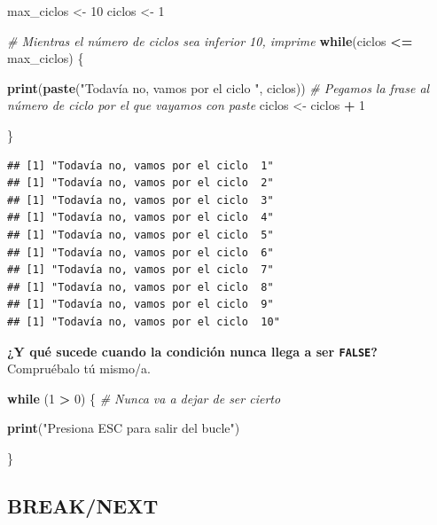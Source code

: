 \documentclass[11pt,]{book}
\newenvironment{Shaded}{\begin{snugshade}}{\end{snugshade}}
\newcommand{\CommentTok}[1]{\textcolor[rgb]{0.37,0.37,0.37}{\textit{#1}}}
\newcommand{\ControlFlowTok}[1]{\textcolor[rgb]{0.27,0.27,0.27}{\textbf{#1}}}
\newcommand{\DecValTok}[1]{\textcolor[rgb]{0.06,0.06,0.06}{#1}}
\newcommand{\KeywordTok}[1]{\textcolor[rgb]{0.27,0.27,0.27}{\textbf{#1}}}
\newcommand{\NormalTok}[1]{#1}
\newcommand{\OperatorTok}[1]{\textcolor[rgb]{0.43,0.43,0.43}{\textbf{#1}}}
\newcommand{\StringTok}[1]{\textcolor[rgb]{0.5,0.5,0.5}{#1}}
\begin{document}
\begin{Shaded}
\begin{Highlighting}[]
\NormalTok{max_ciclos <-}\StringTok{ }\DecValTok{10}
\NormalTok{ciclos <-}\StringTok{ }\DecValTok{1}

\CommentTok{# Mientras el número de ciclos sea inferior 10, imprime}
\ControlFlowTok{while}\NormalTok{(ciclos }\OperatorTok{<=}\StringTok{ }\NormalTok{max_ciclos) \{}
  
  \KeywordTok{print}\NormalTok{(}\KeywordTok{paste}\NormalTok{(}\StringTok{"Todavía no, vamos por el ciclo "}\NormalTok{, ciclos)) }\CommentTok{# Pegamos la frase al número de ciclo por el que vayamos con paste}
\NormalTok{  ciclos <-}\StringTok{ }\NormalTok{ciclos }\OperatorTok{+}\StringTok{ }\DecValTok{1}
  
\NormalTok{\}}
\end{Highlighting}
\end{Shaded}

\begin{verbatim}
## [1] "Todavía no, vamos por el ciclo  1"
## [1] "Todavía no, vamos por el ciclo  2"
## [1] "Todavía no, vamos por el ciclo  3"
## [1] "Todavía no, vamos por el ciclo  4"
## [1] "Todavía no, vamos por el ciclo  5"
## [1] "Todavía no, vamos por el ciclo  6"
## [1] "Todavía no, vamos por el ciclo  7"
## [1] "Todavía no, vamos por el ciclo  8"
## [1] "Todavía no, vamos por el ciclo  9"
## [1] "Todavía no, vamos por el ciclo  10"
\end{verbatim}

\textbf{¿Y qué sucede cuando la condición nunca llega a ser \texttt{FALSE}?} Compruébalo tú mismo/a.

\begin{Shaded}
\begin{Highlighting}[]
\ControlFlowTok{while}\NormalTok{ (}\DecValTok{1} \OperatorTok{>}\StringTok{ }\DecValTok{0}\NormalTok{) \{ }\CommentTok{# Nunca va a dejar de ser cierto}
  
  \KeywordTok{print}\NormalTok{(}\StringTok{"Presiona ESC para salir del bucle"}\NormalTok{)}
  
\NormalTok{\}}
\end{Highlighting}
\end{Shaded}

\hypertarget{breaknext}{%
\subsection{BREAK/NEXT}\label{breaknext}}
\end{document}
